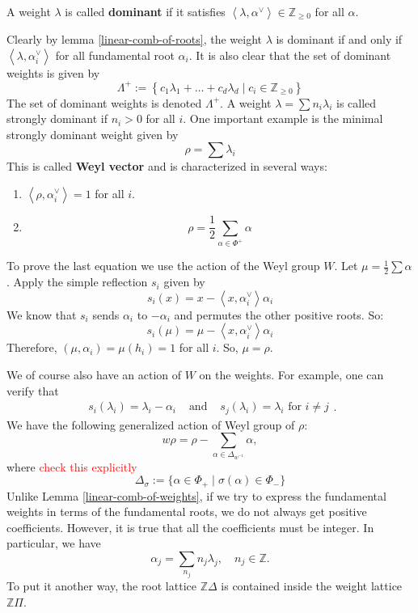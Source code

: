 \begin{definition}
    A weight $\lambda$ is called \textbf{dominant} if it satisfies $\left\langle \lambda,\alpha^{\vee} \right\rangle \in \mathbb{Z}_{\ge 0}$ for all $\alpha$.
\end{definition}
Clearly by lemma \ref{linear-comb-of-roots}, the weight $\lambda$ is dominant if and only if $\left\langle\lambda,\alpha_i^\vee\right\rangle$ for all
fundamental root $\alpha_i$. It is also clear that the set of dominant weights is given by
\[\Lambda^+ := \left\lbrace c_1\lambda_1+\ldots+c_d\lambda_d \mid c_i \in \mathbb{Z}_{\ge 0}\right\rbrace\]
The set of dominant weights is denoted $\Lambda^+$. A weight $\lambda = \sum n_i \lambda_i$ is called strongly dominant if $n_i > 0$ for all $i$. One important example is the minimal strongly dominant weight given by
\[
    \rho = \sum \lambda_i
\]
This is called \textbf{Weyl vector} and is characterized in several ways:

\begin{enumerate}
    \item $\left\langle\rho,\alpha_i^\vee\right\rangle = 1$ for all $i$.
    \item
          \[
              \rho = \frac{1}{2} \sum_{\alpha \in \Phi^+} \alpha
          \]
\end{enumerate}

To prove the last equation we use the action of the Weyl group $W$. Let $\mu = \frac{1}{2} \sum \alpha$. Apply the simple reflection $s_i$ given by
\[
    s_i(x) = x - \left\langle x, \alpha_i^\vee\right\rangle \alpha_i
\]
We know that $s_i$ sends $\alpha_i$ to $-\alpha_i$ and permutes the other positive roots. So:
\[
    s_i(\mu) = \mu -  \left\langle x, \alpha_i^\vee\right\rangle  \alpha_i
\]
Therefore, $(\mu, \alpha_i) = \mu(h_i) = 1$ for all $i$. So, $\mu = \rho$.

We of course also have an action of $W$ on the weights.  For example, one can verify that
\[ \begin{array}{lcr} s_i(\lambda_i) = \lambda_i - \alpha_i & \text{ and } & s_j(\lambda_i) = \lambda_i \mbox{ for } i \neq j \end{array}.\]
We have the following generalized action of Weyl group of $\rho$:
\[ w \rho = \rho - \sum_{\alpha \in \Delta_{w^{-1}}} \alpha,\]
where \textcolor{red}{check this explicitly}
\[\Delta_{\sigma}:= \{ \alpha \in \Phi_+ \mid \sigma(\alpha) \in \Phi_- \}\]
Unlike Lemma \ref{linear-comb-of-weights}, if we try to express the fundamental weights in terms of the fundamental roots, we do not always
get positive coefficients. However, it is true that all the coefficients must be integer. In particular, we have
\[\alpha_j = \sum_{n_j}n_j\lambda_j, \quad n_j \in \mathbb{Z}.\]
To put it another way, the root lattice $\mathbb{Z}\Delta$ is contained inside the weight lattice $\mathbb{Z}\Pi$.




